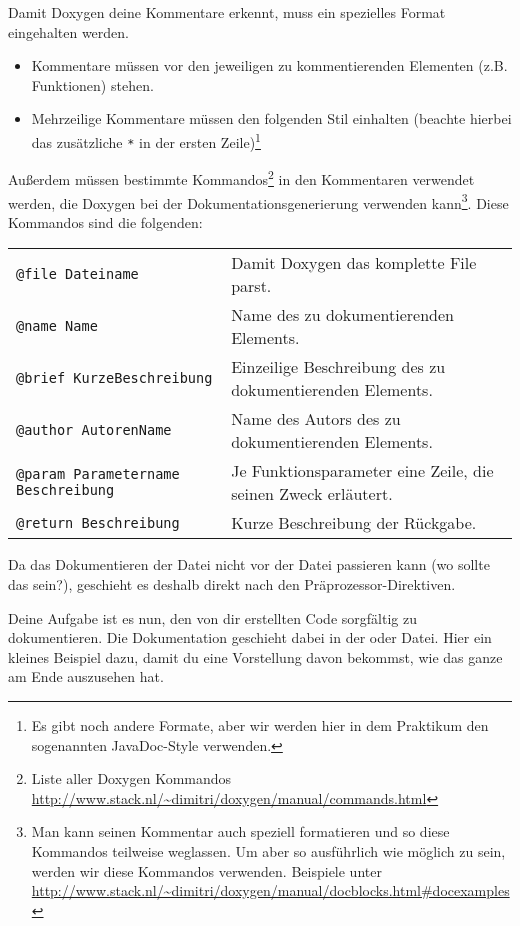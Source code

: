 Damit Doxygen deine Kommentare erkennt, muss ein spezielles Format eingehalten werden.
\begin{itemize}
    \item Kommentare müssen vor den jeweiligen zu kommentierenden Elementen (z.B. Funktionen) stehen.
    \item{Mehrzeilige Kommentare müssen den folgenden Stil einhalten (beachte hierbei das zusätzliche \lstinline{*} in der ersten Zeile)\footnote{Es gibt noch andere Formate, aber wir werden hier in dem Praktikum den sogenannten JavaDoc-Style verwenden.}
		}
\end{itemize}

Außerdem müssen bestimmte Kommandos\footnote{Liste aller Doxygen Kommandos \url{http://www.stack.nl/~dimitri/doxygen/manual/commands.html}} in den Kommentaren verwendet werden, die Doxygen bei der Dokumentationsgenerierung verwenden kann\footnote{Man kann seinen Kommentar auch speziell formatieren und so diese Kommandos teilweise weglassen.
Um aber so ausführlich wie möglich zu sein, werden wir diese Kommandos verwenden.
Beispiele unter \url{http://www.stack.nl/~dimitri/doxygen/manual/docblocks.html\#docexamples}}.
Diese Kommandos sind die folgenden:

\medskip
\begin{tabular}{ll}
{\lstinline!@file Dateiname!} & Damit Doxygen das komplette File parst. \\
{\lstinline!@name Name!} & Name des zu dokumentierenden Elements. \\
{\lstinline!@brief KurzeBeschreibung!} & Einzeilige Beschreibung des zu dokumentierenden Elements. \\
{\lstinline!@author AutorenName!} & Name des Autors des zu dokumentierenden Elements. \\
{\lstinline!@param Parametername Beschreibung!} & Je Funktionsparameter eine Zeile, die seinen Zweck erläutert. \\
{\lstinline!@return Beschreibung!} & Kurze Beschreibung der Rückgabe. \\
\end{tabular}
\medskip

Da das Dokumentieren der Datei nicht vor der Datei passieren kann (wo sollte das sein?), geschieht es deshalb direkt nach den Präprozessor-Direktiven.

Deine Aufgabe ist es nun, den von dir erstellten Code sorgfältig zu dokumentieren.
Die Dokumentation geschieht dabei in der  oder  Datei. Hier ein kleines Beispiel dazu, damit du eine Vorstellung davon bekommst, wie das ganze am Ende auszusehen hat.

